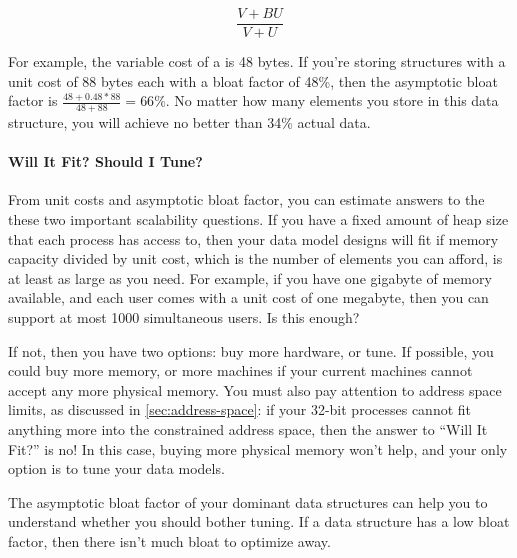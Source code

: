 $$\frac{V + B U}{V + U}$$

For example, the variable cost of a  is 48 bytes. If you're
storing structures with a unit cost of 88 bytes each with a bloat factor of
48\%, then the asymptotic bloat factor is $\frac{48 + 0.48 * 88}{48 + 88} =
66\%$. No matter how many elements you store in this data structure, you will
achieve no better than 34\% actual data.


\paragraph{Will It Fit? Should I Tune?}

From unit costs and asymptotic bloat factor, you can estimate answers to the
these two important scalability questions. If you have a fixed amount of heap
size that each process has access to, then your data model designs will fit if
memory capacity divided by unit cost, which is the number of elements you can
afford, is at least as large as you need. For example, if you have one gigabyte
of memory available, and each user comes with a unit cost of one megabyte, then
you can support at most 1000 simultaneous users. Is this enough? 

If not, then you have two options: buy more hardware, or tune. If possible, you
could buy more memory, or more machines if your current machines cannot accept
any more physical memory. You must also pay attention to address space limits,
as discussed in \autoref{sec:address-space}: if your 32-bit processes cannot fit
anything more into the constrained address space, then the answer to ``Will It
Fit?'' is no! In this case, buying more physical memory won't help, and your only
option is to tune your data models.

The asymptotic bloat factor of your dominant data structures can help you to
understand whether you should bother tuning. If a data structure has a low bloat
factor, then there isn't much bloat to optimize away. 



